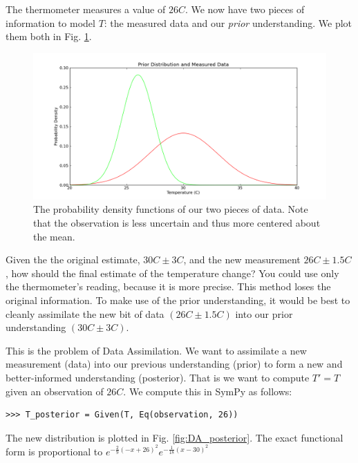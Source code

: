 The thermometer measures a value of $26C$. We now have two pieces of
information to model $T$: the measured data and our \textit{prior}
understanding. We plot them both in Fig. \ref{fig:DA_data}.

\begin{figure}[ht]
\vspace{-0pt}
\centering
\includegraphics[width=.7\textwidth]{images/data.png}
\vspace{-0pt}
\caption{The probability density functions of our two pieces of data. Note that the observation is less uncertain and thus more centered about the mean.}
\label{fig:DA_data}
\vspace{00pt}
\end{figure}

Given the the original estimate, $30C \pm 3C$, and the new measurement $26C \pm
1.5C$, how should the final estimate of the temperature change?  You could use
only the thermometer's reading, because it is more precise. This method loses
the original information. To make use of the prior understanding, it would be best
to cleanly assimilate the new bit of data $(26C \pm 1.5C)$ into our prior
understanding $(30C \pm 3C)$.

This is the problem of Data Assimilation. We want to assimilate a new
measurement (data) into our previous understanding (prior) to form a new and
better-informed understanding (posterior). That is we want to compute $T' = T$
given an observation of $26C$. We compute this in SymPy as follows:

\begin{lstlisting}
>>> T_posterior = Given(T, Eq(observation, 26))
\end{lstlisting}

The new distribution is plotted in Fig. \ref{fig:DA_posterior}. The exact
functional form is proportional to $e^{-\frac{2}{9} \left(-x + 26\right)^{2}}
e^{-\frac{1}{18} \left(x-30\right)^{2}}$

